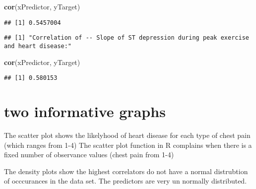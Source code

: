 \documentclass[]{article}
\newenvironment{Shaded}{\begin{snugshade}}{\end{snugshade}}
\newcommand{\KeywordTok}[1]{\textcolor[rgb]{0.13,0.29,0.53}{\textbf{#1}}}
\newcommand{\DataTypeTok}[1]{\textcolor[rgb]{0.13,0.29,0.53}{#1}}
\newcommand{\StringTok}[1]{\textcolor[rgb]{0.31,0.60,0.02}{#1}}
\newcommand{\CommentTok}[1]{\textcolor[rgb]{0.56,0.35,0.01}{\textit{#1}}}
\newcommand{\OperatorTok}[1]{\textcolor[rgb]{0.81,0.36,0.00}{\textbf{#1}}}
\newcommand{\NormalTok}[1]{#1}
\begin{document}
\begin{Shaded}
\begin{Highlighting}[]
\KeywordTok{cor}\NormalTok{(xPredictor, yTarget)}
\end{Highlighting}
\end{Shaded}

\begin{verbatim}
## [1] 0.5457004
\end{verbatim}

\begin{Shaded}
\end{Shaded}

\begin{verbatim}
## [1] "Correlation of -- Slope of ST depression during peak exercise and heart disease:"
\end{verbatim}

\begin{Shaded}
\begin{Highlighting}[]
\KeywordTok{cor}\NormalTok{(xPredictor, yTarget)}
\end{Highlighting}
\end{Shaded}

\begin{verbatim}
## [1] 0.580153
\end{verbatim}

\section{two informative graphs}\label{two-informative-graphs}

The scatter plot shows the likelyhood of heart disease for each type of
chest pain (which ranges from 1-4) The scatter plot function in R
complains when there is a fixed number of observance values (chest pain
from 1-4)

The density plots show the highest correlators do not have a normal
distrubtion of occcurances in the data set. The predictors are very un
normally distributed.

\begin{Shaded}
\end{Shaded}
\end{document}
